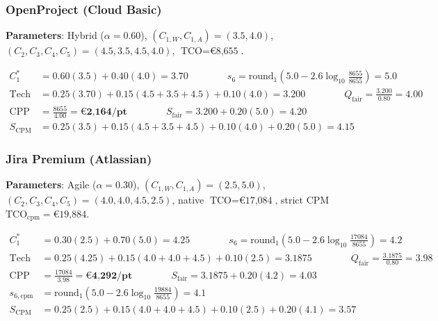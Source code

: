 \subsubsection{OpenProject (Cloud Basic)}
\textbf{Parameters}: Hybrid ($\alpha = 0.60$), $(C_{1,W}, C_{1,A}) = (3.5, 4.0)$, $(C_2, C_3, C_4, C_5) = (4.5, 3.5, 4.5, 4.0)$, $\text{TCO} = \text{€8,655}$.
\begin{small}
\begin{align*}
    C_1^* &= 0.60(3.5) + 0.40(4.0) = \mathbf{3.70} \qquad \qquad
    s_6 = \text{round}_1\!\left(5.0 - 2.6\log_{10}\!\tfrac{8655}{8655}\right) = \mathbf{5.0} \\
    \text{Tech} &= 0.25(3.70) + 0.15(4.5 + 3.5 + 4.5) + 0.10(4.0) = 3.200 \qquad \qquad
    Q_{\text{fair}} = \tfrac{3.200}{0.80} = \mathbf{4.00} \\
    \text{CPP} &= \tfrac{8655}{4.00} = \mathbf{\text{€2,164/pt}} \qquad \qquad
    S_{\text{fair}} = 3.200 + 0.20(5.0) = \mathbf{4.20} \\
    S_{\text{CPM}} &= 0.25(3.5) + 0.15(4.5 + 3.5 + 4.5) + 0.10(4.0) + 0.20(5.0) = \mathbf{4.15}
\end{align*}
\end{small}

\subsubsection{Jira Premium (Atlassian)}
\textbf{Parameters}: Agile ($\alpha = 0.30$), $(C_{1,W}, C_{1,A}) = (2.5, 5.0)$, $(C_2, C_3, C_4, C_5) = (4.0, 4.0, 4.5, 2.5)$, native $\text{TCO} = \text{€17,084}$, strict CPM $\text{TCO}_{\text{cpm}} = \text{€19,884}$.
\begin{small}
\begin{align*}
    C_1^* &= 0.30(2.5) + 0.70(5.0) = \mathbf{4.25} \qquad \qquad
    s_6 = \text{round}_1\!\left(5.0 - 2.6\log_{10}\!\tfrac{17084}{8655}\right) = \mathbf{4.2} \\
    \text{Tech} &= 0.25(4.25) + 0.15(4.0 + 4.0 + 4.5) + 0.10(2.5) = 3.1875 \qquad \qquad
    Q_{\text{fair}} = \tfrac{3.1875}{0.80} = \mathbf{3.98} \\
    \text{CPP} &= \tfrac{17084}{3.98} = \mathbf{\text{€4,292/pt}} \qquad \qquad
    S_{\text{fair}} = 3.1875 + 0.20(4.2) = \mathbf{4.03} \\
    s_{6,\text{cpm}} &= \text{round}_1\!\left(5.0 - 2.6\log_{10}\!\tfrac{19884}{8655}\right) = \mathbf{4.1} \\
    S_{\text{CPM}} &= 0.25(2.5) + 0.15(4.0 + 4.0 + 4.5) + 0.10(2.5) + 0.20(4.1) = \mathbf{3.57}
\end{align*}
\end{small}


